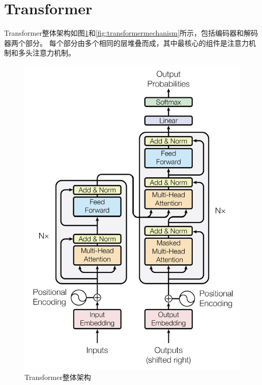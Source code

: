 \section{Transformer}

Transformer整体架构如图\ref{fig:TransformerArchitecture}和\ref{fig:transformermechanism}所示，包括编码器和解码器两个部分。
每个部分由多个相同的层堆叠而成，其中最核心的组件是注意力机制和多头注意力机制。
\begin{figure}
    \centering
    \includegraphics[width=0.3\linewidth]{./figures/TransformerArchitecture.jpg}
    \caption{Transformer整体架构}
    \label{fig:TransformerArchitecture}
\end{figure}

